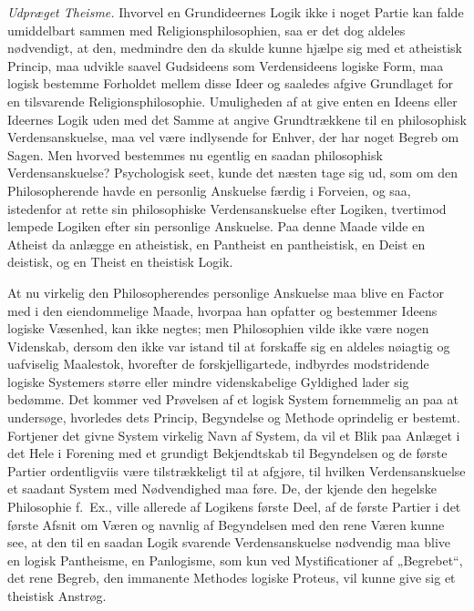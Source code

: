 \documentclass[12pt]{book}
\newcommand{\opage}[1]{\marginnote{\footnotesize\textit{[#1]}}}
\begin{document}
\emph{Udpræget Theisme.} Ihvorvel en Grundideernes Logik ikke i noget Partie kan falde umiddelbart sammen med Religionsphilosophien, saa er det dog aldeles nødvendigt, at den, medmindre den da skulde kunne hjælpe sig med et atheistisk Princip, maa udvikle saavel Gudsideens som Verdensideens logiske Form, maa logisk bestemme Forholdet mellem disse Ideer og saaledes afgive Grundlaget for en tilsvarende Religionsphilosophie. Umuligheden af at give enten en Ideens eller Ideernes Logik uden med det Samme at angive Grundtrækkene til en philosophisk Verdensanskuelse, maa vel være indlysende for Enhver, der har noget Begreb om Sagen. Men hvorved bestemmes nu egentlig en saadan philosophisk Verdensanskuelse? Psychologisk seet, kunde det næsten tage sig ud, som om den Philosopherende havde en personlig Anskuelse færdig i Forveien, og saa, istedenfor at rette sin philosophiske Verdensanskuelse efter Logiken, tvertimod lempede Logiken efter sin personlige Anskuelse. Paa denne Maade vilde en Atheist da anlægge en atheistisk, en Pantheist en pantheistisk, en Deist en deistisk, og en Theist en theistisk Logik.

At nu virkelig den Philosopherendes personlige Anskuelse maa blive en Factor med i den eiendommelige Maade, hvorpaa han opfatter og bestemmer Ideens logiske Væsenhed, kan ikke
\opage{IX}negtes; men Philosophien vilde ikke være nogen Videnskab, dersom den ikke var istand til at forskaffe sig en aldeles nøiagtig og uafviselig Maalestok, hvorefter de forskjelligartede, indbyrdes modstridende logiske Systemers større eller mindre videnskabelige Gyldighed lader sig bedømme. Det kommer ved Prøvelsen af et logisk System fornemmelig an paa at undersøge, hvorledes dets Princip, Begyndelse og Methode oprindelig er bestemt. Fortjener det givne System virkelig Navn af System, da vil et Blik paa Anlæget i det Hele i Forening med et grundigt Bekjendtskab til Begyndelsen og de første Partier ordentligviis være tilstrækkeligt til at afgjøre, til hvilken Verdensanskuelse et saadant System med Nødvendighed maa føre. De, der kjende den hegelske Philosophie f.\ Ex., ville allerede af Logikens første Deel, af de første Partier i det første Afsnit om Væren og navnlig af Begyndelsen med den rene Væren kunne see, at den til en saadan Logik svarende Verdensanskuelse nødvendig maa blive en logisk Pantheisme, en Panlogisme, som kun ved Mystificationer af „Begrebet“, det rene Begreb, den immanente Methodes logiske Proteus, vil kunne give sig et theistisk Anstrøg.
\end{document}

